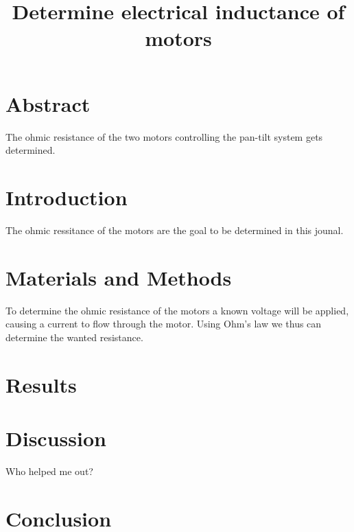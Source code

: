 \documentclass[../../rapport/main]{article}
\title{Determine electrical inductance of motors}
\begin{document}
\section{Abstract}
The ohmic resistance of the two motors controlling the pan-tilt system gets determined.
\section{Introduction}
The ohmic ressitance of the motors are the goal to be determined in this jounal.
\section{Materials and Methods}
To determine the ohmic resistance of the motors a known voltage will be applied, causing a current to flow through the motor. Using Ohm's law we thus can determine the wanted resistance.
\section{Results}




\section{Discussion}
Who helped me out?
\section{Conclusion}
\end{document}
